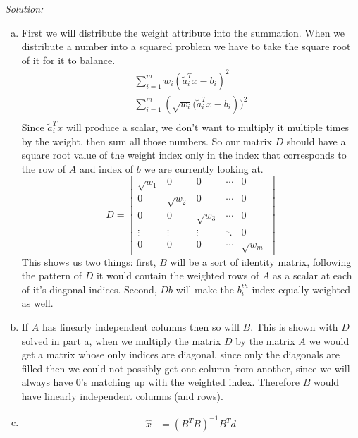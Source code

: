 \documentclass{article}
\newenvironment{solution}
    {\textit{Solution:}}
    {}
\begin{document}
\begin{solution}
\begin{enumerate}[(a)]
    \item First we will distribute the weight attribute into the summation. When we distribute a number into a squared problem we have to take the square root of it for it to balance. 
    \begin{align*}
        \sum_{i=1}^{m}w_i\left(\tilde{a}_{i}^{T} x-b_{i}\right)^{2}\\
        \sum_{i=1}^{m}\left(\sqrt{w_i}(\tilde{a}_{i}^{T}x-b_{i}\right))^{2}\\
    \end{align*}
    Since $\tilde{a}_{i}^{T}x$ will produce a scalar, we don't want to multiply it multiple times by the weight, then sum all those numbers. So our matrix $D$ should have a square root value of the weight index only in the index that corresponds to the row of $A$ and index of $b$ we are currently looking at. $$D = 
    \begin{bmatrix} \sqrt{w_1} & 0 & 0 & \cdots & 0 \\ 
                    0 & \sqrt{w_2} & 0 & \cdots & 0 \\ 
                    0 & 0 & \sqrt{w_3} & \cdots & 0 \\
                    \vdots & \vdots & \vdots & \ddots & 0 \\
                    0 & 0 & 0 & \cdots & \sqrt{w_m} \end{bmatrix}$$
    This shows us two things: first, $B$ will be a sort of identity matrix, following the pattern of $D$ it would contain the weighted rows of $A$ as a scalar at each of it's diagonal indices. Second, $Db$ will make the $b_i^{th}$ index equally weighted as well. 
    \item If $A$ has linearly independent columns then so will $B$. This is shown with $D$ solved in part a, when we multiply the matrix $D$ by the matrix $A$ we would get a matrix whose only indices are diagonal. since only the diagonals are filled then we could not possibly get one column from another, since we will always have 0's matching up with the weighted index. Therefore $B$ would have linearly independent columns (and rows).
    \item \begin{align*}
        \hat{x} &= (B^TB)^{-1}B^Td
    \end{align*}
\end{enumerate}
\end{solution}
\end{document}
